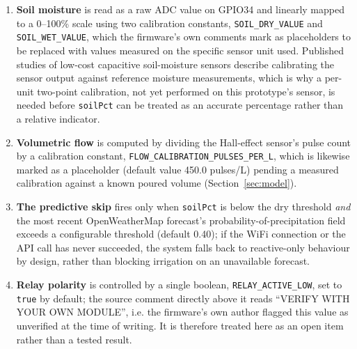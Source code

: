 \documentclass[conference]{IEEEtran}
\begin{document}
\begin{enumerate}
\item \textbf{Soil moisture} is read as a raw ADC value on GPIO34 and
linearly mapped to a 0--100\% scale using two calibration constants,
\texttt{SOIL\_DRY\_VALUE} and \texttt{SOIL\_WET\_VALUE}, which the
firmware's own comments mark as placeholders to be replaced with values
measured on the specific sensor unit used. Published studies of
low-cost capacitive soil-moisture sensors
\cite{adla2020laboratory,abdelmoneim2025calibration} describe
calibrating the sensor output against reference moisture measurements,
which is why a per-unit two-point calibration, not yet performed on this
prototype's sensor, is needed before \texttt{soilPct} can be treated as
an accurate percentage rather than a relative indicator.
\item \textbf{Volumetric flow} is computed by dividing the Hall-effect
sensor's pulse count by a calibration constant,
\texttt{FLOW\_CALIBRATION\_PULSES\_PER\_L}, which is likewise marked as
a placeholder (default value 450.0 pulses/L) pending a measured
calibration against a known poured volume (Section~\ref{sec:model}).
\item \textbf{The predictive skip} fires only when \texttt{soilPct} is
below the dry threshold \emph{and} the most recent OpenWeatherMap
forecast's probability-of-precipitation field exceeds a configurable
threshold (default 0.40); if the WiFi connection or the API call has
never succeeded, the system falls back to reactive-only behaviour by
design, rather than blocking irrigation on an unavailable forecast.
\item \textbf{Relay polarity} is controlled by a single boolean,
\texttt{RELAY\_ACTIVE\_LOW}, set to \texttt{true} by default; the
source comment directly above it reads ``VERIFY WITH YOUR OWN MODULE'',
i.e. the firmware's own author flagged this value as unverified at the
time of writing. It is therefore treated here as an open item rather
than a tested result.
\end{enumerate}
\end{document}
